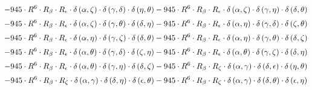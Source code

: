 \begin{subequations}
\begin{gather}
 \\[0.2em] \notag 		 - 945 \cdot R^{6} \cdot R_{\beta{}} \cdot R_{\epsilon{}} \cdot \delta{}\left(\alpha{}, \zeta{}\right) \cdot \delta{}\left(\gamma{}, \delta{}\right) \cdot \delta{}\left(\eta{}, \theta{}\right)- 945 \cdot R^{6} \cdot R_{\beta{}} \cdot R_{\epsilon{}} \cdot \delta{}\left(\alpha{}, \zeta{}\right) \cdot \delta{}\left(\gamma{}, \eta{}\right) \cdot \delta{}\left(\delta{}, \theta{}\right) 
 \\[0.2em] \notag 		 - 945 \cdot R^{6} \cdot R_{\beta{}} \cdot R_{\epsilon{}} \cdot \delta{}\left(\alpha{}, \zeta{}\right) \cdot \delta{}\left(\gamma{}, \theta{}\right) \cdot \delta{}\left(\delta{}, \eta{}\right)- 945 \cdot R^{6} \cdot R_{\beta{}} \cdot R_{\epsilon{}} \cdot \delta{}\left(\alpha{}, \eta{}\right) \cdot \delta{}\left(\gamma{}, \delta{}\right) \cdot \delta{}\left(\zeta{}, \theta{}\right) 
 \\[0.2em] \notag 		 - 945 \cdot R^{6} \cdot R_{\beta{}} \cdot R_{\epsilon{}} \cdot \delta{}\left(\alpha{}, \eta{}\right) \cdot \delta{}\left(\gamma{}, \zeta{}\right) \cdot \delta{}\left(\delta{}, \theta{}\right)- 945 \cdot R^{6} \cdot R_{\beta{}} \cdot R_{\epsilon{}} \cdot \delta{}\left(\alpha{}, \eta{}\right) \cdot \delta{}\left(\gamma{}, \theta{}\right) \cdot \delta{}\left(\delta{}, \zeta{}\right) 
 \\[0.2em] \notag 		 - 945 \cdot R^{6} \cdot R_{\beta{}} \cdot R_{\epsilon{}} \cdot \delta{}\left(\alpha{}, \theta{}\right) \cdot \delta{}\left(\gamma{}, \delta{}\right) \cdot \delta{}\left(\zeta{}, \eta{}\right)- 945 \cdot R^{6} \cdot R_{\beta{}} \cdot R_{\epsilon{}} \cdot \delta{}\left(\alpha{}, \theta{}\right) \cdot \delta{}\left(\gamma{}, \zeta{}\right) \cdot \delta{}\left(\delta{}, \eta{}\right) 
 \\[0.2em] \notag 		 - 945 \cdot R^{6} \cdot R_{\beta{}} \cdot R_{\epsilon{}} \cdot \delta{}\left(\alpha{}, \theta{}\right) \cdot \delta{}\left(\gamma{}, \eta{}\right) \cdot \delta{}\left(\delta{}, \zeta{}\right)- 945 \cdot R^{6} \cdot R_{\beta{}} \cdot R_{\zeta{}} \cdot \delta{}\left(\alpha{}, \gamma{}\right) \cdot \delta{}\left(\delta{}, \epsilon{}\right) \cdot \delta{}\left(\eta{}, \theta{}\right) 
 \\[0.2em] \notag 		 - 945 \cdot R^{6} \cdot R_{\beta{}} \cdot R_{\zeta{}} \cdot \delta{}\left(\alpha{}, \gamma{}\right) \cdot \delta{}\left(\delta{}, \eta{}\right) \cdot \delta{}\left(\epsilon{}, \theta{}\right)- 945 \cdot R^{6} \cdot R_{\beta{}} \cdot R_{\zeta{}} \cdot \delta{}\left(\alpha{}, \gamma{}\right) \cdot \delta{}\left(\delta{}, \theta{}\right) \cdot \delta{}\left(\epsilon{}, \eta{}\right) 

\end{gather}
\end{subequations}
